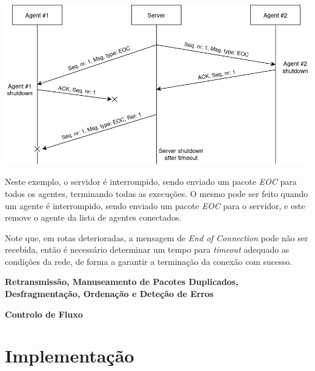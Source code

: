 \documentclass[a4paper,12pt]{scrreprt}
\begin{document}
\begin{minipage}{\textwidth}
    \centering
    \includegraphics[width=\textwidth]{img/sequence_diagrams/end_of_connection.png}
    \label{fig:nt_end_of_connection}
\end{minipage}

Neste exemplo, o servidor é interrompido, sendo enviado um pacote \textit{EOC} para
todos os agentes, terminando todas as execuções. O mesmo pode ser feito quando um agente
é interrompido, sendo enviado um pacote \textit{EOC} para o servidor, e este remove
o agente da lista de agentes conectados.

Note que, em rotas deterioradas, a mensagem de \textit{End of Connection} pode não ser recebida,
então é necessário determinar um tempo para \textit{timeout} adequado as condições da rede,
de forma a garantir a terminação da conexão com sucesso.

\textbf{Retransmissão, Manuseamento de Pacotes Duplicados, Desfragmentação, Ordenação e Deteção de Erros}

\textbf{Controlo de Fluxo}



\chapter{Implementação}
\end{document}
